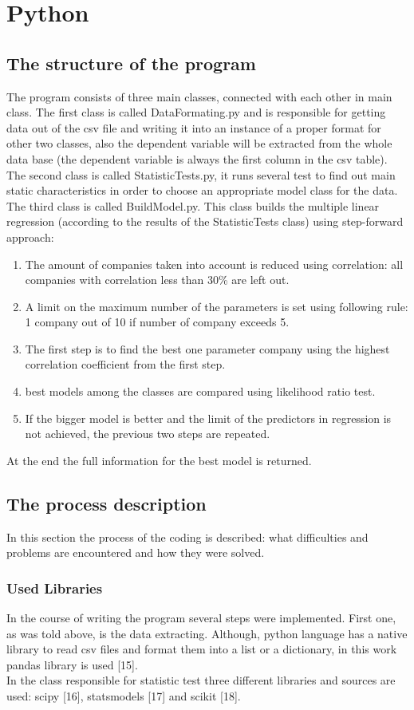 \documentclass{article}
\begin{document}
\newpage
\section{Python}
\subsection{The structure of the program}
The program consists of three main classes, connected with each other in main class. The first class is called DataFormating.py and is responsible for getting data out of the csv file and writing it into an instance of a proper format for other two classes, also the dependent variable will be extracted from the whole data base (the dependent variable is always the first column in the csv table).\\
The second class is called StatisticTests.py, it runs several test to find out main static characteristics in order to choose an appropriate model class for the data.\\
The third class is called BuildModel.py. This class builds the multiple linear regression (according to the results of the StatisticTests class) using step-forward approach:
\begin{enumerate}
    \item The amount of companies taken into account is reduced using correlation: all companies with correlation less than 30\% are left out.
    \item A limit on the maximum number of the parameters is set using following rule: 1 company out of 10 if number of company exceeds 5.
    \item The first step is to find the best one parameter company using the highest correlation coefficient from the first step.
    \item best models among the classes are compared using likelihood ratio test. 
    \item If the bigger model is better and the limit of the predictors in regression is not achieved, the previous two steps are repeated.
\end{enumerate} 
At the end the full information for the best model is returned.

\subsection{The process description}
In this section the process of the coding is described: what difficulties and problems are encountered and how they were solved.
\subsubsection{Used Libraries}
In the course of writing the program several steps were implemented. First one, as was told above, is the data extracting. Although, python language has a native library to read csv files and format them into a list or a dictionary, in this work pandas library is used [15]. \\
In the class responsible for statistic test three different libraries and sources are used: scipy [16], statsmodels [17] and scikit [18]. 
\end{document}
